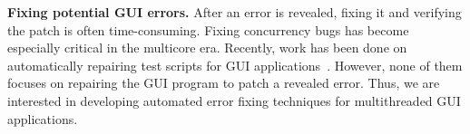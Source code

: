 \textbf{Fixing potential GUI errors.} After an error is revealed, fixing
it and verifying the patch is often time-consuming. Fixing concurrency
bugs has become especially critical in the multicore era.
Recently, work has been done
on automatically repairing test scripts for GUI applications~\cite{Daniel:2011:AGR:2002931.2002937, Huang:2010:RGT:1828417.1828465}. However, none of them focuses on repairing
the GUI program to patch a revealed error. Thus, we are interested in 
developing automated error fixing techniques for
multithreaded GUI applications.

